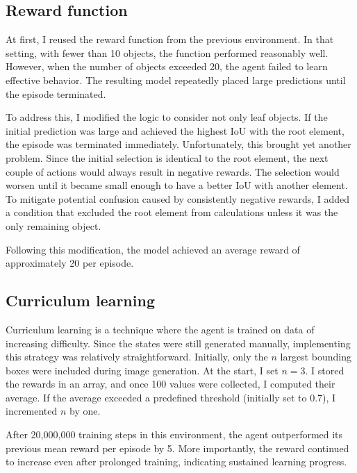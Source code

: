 \documentclass[
  digital,     %
  oneside,     %
  nosansbold,  %
  nocolorbold, %
  lof,         %
  lot,         %
]{fithesis4}
\begin{document}
\subsection{Reward function}

At first, I reused the reward function from the previous environment. In that setting, with fewer than 10 objects, the function performed reasonably well. However, when the number of objects exceeded 20, the agent failed to learn effective behavior. The resulting model repeatedly placed large predictions until the episode terminated.

To address this, I modified the logic to consider not only leaf objects. If the initial prediction was large and achieved the highest IoU with the root element, the episode was terminated immediately. Unfortunately, this brought yet another problem. Since the initial selection is identical to the root element, the next couple of actions would always result in negative rewards. The selection would worsen until it became small enough to have a better IoU with another element. To mitigate potential confusion caused by consistently negative rewards, I added a condition that excluded the root element from calculations unless it was the only remaining object.

Following this modification, the model achieved an average reward of approximately 20 per episode.

\subsection{Curriculum learning}

Curriculum learning is a technique where the agent is trained on data of increasing difficulty. Since the states were still generated manually, implementing this strategy was relatively straightforward. Initially, only the $n$ largest bounding boxes were included during image generation. At the start, I set $n=3$. I stored the rewards in an array, and once 100 values were collected, I computed their average. If the average exceeded a predefined threshold (initially set to 0.7), I incremented $n$ by one.

After 20,000,000 training steps in this environment, the agent outperformed its previous mean reward per episode by 5. More importantly, the reward continued to increase even after prolonged training, indicating sustained learning progress.
\end{document}

